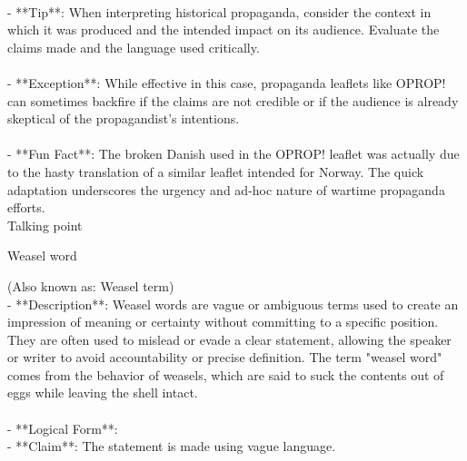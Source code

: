 \documentclass[a4paper,12pt,single,pdftex]{scrartcl}
\begin{document}
    
      
    \\

    
      - **Tip**: When interpreting historical propaganda, consider the context in which it was produced and the intended impact on its audience. Evaluate the claims made and the language used critically.
    \\

    
      
    \\

    
      - **Exception**: While effective in this case, propaganda leaflets like OPROP! can sometimes backfire if the claims are not credible or if the audience is already skeptical of the propagandist's intentions.
    \\

    
      
    \\

    
      - **Fun Fact**: The broken Danish used in the OPROP! leaflet was actually due to the hasty translation of a similar leaflet intended for Norway. The quick adaptation underscores the urgency and ad-hoc nature of wartime propaganda efforts.
    \\

  

Talking point

Weasel word
    
      (Also known as: Weasel term)
    \\

  
    
      - **Description**: Weasel words are vague or ambiguous terms used to create an impression of meaning or certainty without committing to a specific position. They are often used to mislead or evade a clear statement, allowing the speaker or writer to avoid accountability or precise definition. The term "weasel word" comes from the behavior of weasels, which are said to suck the contents out of eggs while leaving the shell intact.
    \\

    
      
    \\

    
      - **Logical Form**:
    \\

    
        - **Claim**: The statement is made using vague language.
    \\
\end{document}
